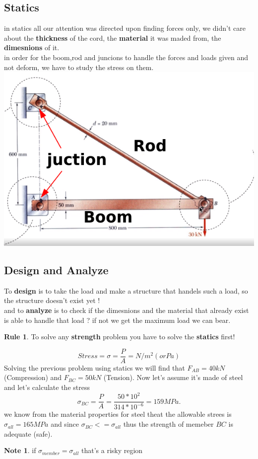 \documentclass[11pt]{article}
\theoremstyle{definition}
\newtheorem{reg}{Rule}
\newtheorem{note}{Note}
\begin{document}
\subsection{Statics}
in statics all our attention was directed upon finding forces only, we didn't care about the \textbf{thickness}  of the cord, the \textbf{material}  it was maded from, the \textbf{dimesnions}  of it.\\
in order for the boom,rod and juncions to handle the forces and loads given and not deform, we have to study the stress on them.
\includegraphics[scale=0.5]{figures/2021-03-30_21-41.png}
\subsection*{Design and Analyze}
To \textbf{design} is to take the load and make a structure that handels such a load, so the structure doesn't exist yet ! \\ and to \textbf{analyze} is to check if the dimesnions and the material that already exist is able to handle that load ? if not we get the maximum load we can bear.
\begin{reg}
	To solve any \textbf{strength}  problem you have to solve the \textbf{statics}  first!
\end{reg}
\begin{equation}
	Stress = \sigma = \frac{P}{A} = N/m^2 (or Pa) 
\end{equation}
Solving the previous problem using statics we will find that $F_{AB} = 40kN$ (Compression) and $F_{BC}=50kN$ (Tension). Now let's assume it's made of steel and let's calculate the stress
\begin{equation}
	\sigma_{BC} = \frac{P}{A} = \frac{50*10^2}{314*10^{-6}} = 159 MPa.  
\end{equation}
we know from the material properties for steel theat the allowable strees is $\sigma_{all} = 165MPa$ and since $\sigma_{BC} <= \sigma_{all}$ thus the strength of memeber $BC$ is adequate (safe).
\begin{note}
	if $\sigma_{member}=\sigma_{all} $ that's a risky region
\end{note}
\end{document}
